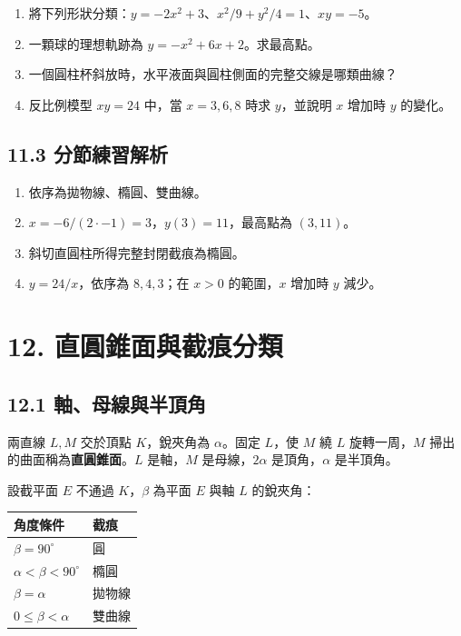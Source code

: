 \documentclass[11pt,a4paper]{article}
\newcounter{none}
\providecommand{\tightlist}{%
  \setlength{\itemsep}{0pt}\setlength{\parskip}{0pt}}
\begin{document}
\begin{enumerate}
\def\labelenumi{\arabic{enumi}.}
\tightlist
\item
  將下列形狀分類：\(y=-2x^2+3\)、\(x^2/9+y^2/4=1\)、\(xy=-5\)。
\item
  一顆球的理想軌跡為 \(y=-x^2+6x+2\)。求最高點。
\item
  一個圓柱杯斜放時，水平液面與圓柱側面的完整交線是哪類曲線？
\item
  反比例模型 \(xy=24\) 中，當 \(x=3,6,8\) 時求 \(y\)，並說明 \(x\) 增加時 \(y\) 的變化。
\end{enumerate}

\subsection{11.3 分節練習解析}\label{ux5206ux7bc0ux7df4ux7fd2ux89e3ux6790-10}

\begin{enumerate}
\def\labelenumi{\arabic{enumi}.}
\tightlist
\item
  依序為拋物線、橢圓、雙曲線。
\item
  \(x=-6/(2\cdot-1)=3\)，\(y(3)=11\)，最高點為 \((3,11)\)。
\item
  斜切直圓柱所得完整封閉截痕為橢圓。
\item
  \(y=24/x\)，依序為 \(8,4,3\)；在 \(x>0\) 的範圍，\(x\) 增加時 \(y\) 減少。
\end{enumerate}

\section{12. 直圓錐面與截痕分類}\label{ux76f4ux5713ux9310ux9762ux8207ux622aux75d5ux5206ux985e}

\subsection{12.1 軸、母線與半頂角}\label{ux8ef8ux6bcdux7ddaux8207ux534aux9802ux89d2}

兩直線 \(L,M\) 交於頂點 \(K\)，銳夾角為 \(\alpha\)。固定 \(L\)，使 \(M\) 繞 \(L\) 旋轉一周，\(M\) 掃出的曲面稱為\textbf{直圓錐面}。\(L\) 是軸，\(M\) 是母線，\(2\alpha\) 是頂角，\(\alpha\) 是半頂角。

設截平面 \(E\) 不通過 \(K\)，\(\beta\) 為平面 \(E\) 與軸 \(L\) 的銳夾角：

{\def\LTcaptype{none} %
\begin{longtable}[]{@{}ll@{}}
\toprule\noalign{}
角度條件 & 截痕 \\
\midrule\noalign{}
\endhead
\bottomrule\noalign{}
\endlastfoot
\(\beta=90^\circ\) & 圓 \\
\(\alpha<\beta<90^\circ\) & 橢圓 \\
\(\beta=\alpha\) & 拋物線 \\
\(0\le\beta<\alpha\) & 雙曲線 \\
\end{longtable}
}
\end{document}

